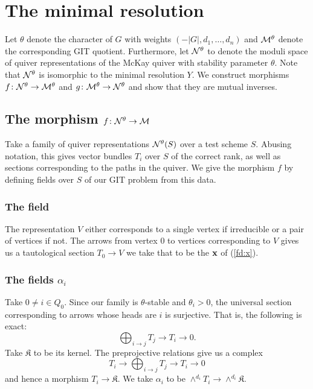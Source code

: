 \documentclass{amsart}
\theoremstyle{definition}
\begin{document}
\section{The minimal resolution}

Let $\theta$ denote the character of $G$ with weights $(-|G|,d_1,\ldots,d_n)$ and $\mathcal{M}^\theta$ denote the corresponding GIT quotient.
Furthermore, let $\mathcal{N}^\theta$ to denote the moduli space of quiver representations of the McKay quiver with stability parameter $\theta$.
Note that $\mathcal{N}^\theta$ is isomorphic to the minimal resolution $Y$.
We construct morphisms $f \colon \mathcal{N}^\theta \rightarrow \mathcal{M}^\theta$ and $g \colon \mathcal{M}^\theta \rightarrow \mathcal{N}^\theta$ and show that they are mutual inverses.

\subsection{The morphism $f \colon \mathcal{N}^\theta \rightarrow \mathcal{M}$}

Take a family of quiver representations $\mathcal{N}^\theta(S)$ over a test scheme $S$.
Abusing notation, this gives vector bundles $T_i$ over $S$ of the correct rank, as well as sections corresponding to the paths in the quiver.
We give the morphism $f$ by defining fields over $S$ of our GIT problem from this data.

\subsubsection{The field \bfx}

The representation $V$ either corresponds to a single vertex if irreducible or a pair of vertices if not.
The arrows from vertex $0$ to vertices corresponding to $V$ gives us a tautological section $T_0 \rightarrow V$ we take that to be the $\mathbf{x}$ of (\ref{fd:x}).

\subsubsection{The fields $\alpha_i$}

Take $0 \neq i \in Q_0$.
Since our family is $\theta$-stable and $\theta_i>0$, the universal section corresponding to arrows whose heads are $i$ is surjective. 
That is, the following is exact:
$$\bigoplus_{i \rightarrow j} T_j \longrightarrow T_i \longrightarrow 0.$$
Take $\mathfrak{K}$ to be its kernel.
The preprojective relations give us a complex
$$T_i \longrightarrow \bigoplus_{i \rightarrow j} T_j \longrightarrow T_i \longrightarrow 0$$
and hence a morphism $T_i \rightarrow \mathfrak{K}$.
We take $\alpha_i$ to be $\wedge^{d_i} T_i \rightarrow \wedge^{d_i}\mathfrak{K}.$
\end{document}
